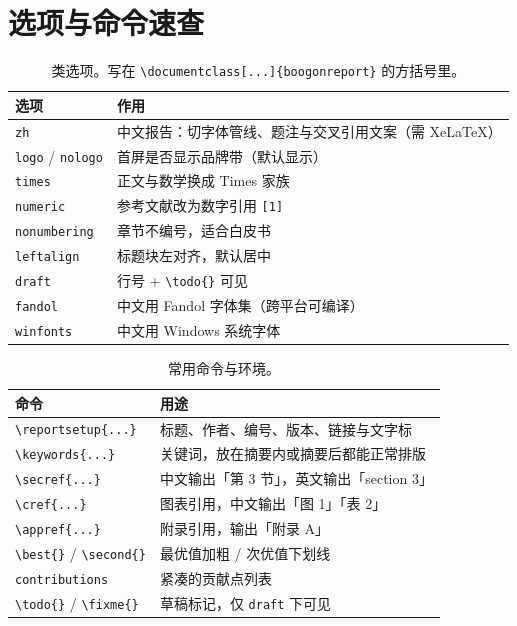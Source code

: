 \section{选项与命令速查}
\label{app:cheatsheet}

\begin{table}[htbp]
  \centering
  \small
  \caption{类选项。写在 \texttt{\textbackslash documentclass[...]\{boogonreport\}} 的方括号里。}
  \label{tab:options}
  \begin{tabular}{@{}ll@{}}
    \toprule
    选项 & 作用 \\
    \midrule
    \texttt{zh}          & 中文报告：切字体管线、题注与交叉引用文案（需 XeLaTeX）\\
    \texttt{logo} / \texttt{nologo} & 首屏是否显示品牌带（默认显示）\\
    \texttt{times}       & 正文与数学换成 Times 家族 \\
    \texttt{numeric}     & 参考文献改为数字引用 \texttt{[1]} \\
    \texttt{nonumbering} & 章节不编号，适合白皮书 \\
    \texttt{leftalign}   & 标题块左对齐，默认居中 \\
    \texttt{draft}       & 行号 + \verb|\todo{}| 可见 \\
    \texttt{fandol}      & 中文用 Fandol 字体集（跨平台可编译）\\
    \texttt{winfonts}    & 中文用 Windows 系统字体 \\
    \bottomrule
  \end{tabular}
\end{table}

\begin{table}[htbp]
  \centering
  \small
  \caption{常用命令与环境。}
  \label{tab:commands}
  \begin{tabular}{@{}ll@{}}
    \toprule
    命令 & 用途 \\
    \midrule
    \verb|\reportsetup{...}| & 标题、作者、编号、版本、链接与文字标 \\
    \verb|\keywords{...}|    & 关键词，放在摘要内或摘要后都能正常排版 \\
    \verb|\secref{...}|      & 中文输出「第 3 节」，英文输出「section 3」\\
    \verb|\cref{...}|        & 图表引用，中文输出「图 1」「表 2」\\
    \verb|\appref{...}|      & 附录引用，输出「附录 A」\\
    \verb|\best{}| / \verb|\second{}| & 最优值加粗 / 次优值下划线 \\
    \texttt{contributions}   & 紧凑的贡献点列表 \\
    \verb|\todo{}| / \verb|\fixme{}| & 草稿标记，仅 \texttt{draft} 下可见 \\
    \bottomrule
  \end{tabular}
\end{table}

